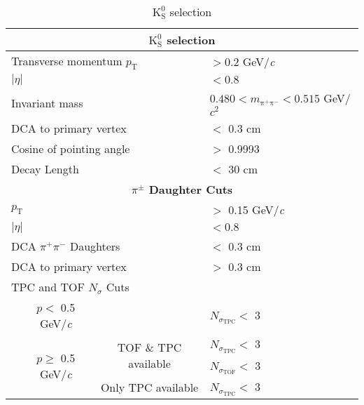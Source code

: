 \documentclass[ALICE,manyauthors]{cernphprep}
\newcommand{\Ks}{$\mathrm{K^{0}_{S}}$\xspace}
\begin{document}
\begin{table}[htbp]
 \centering
  \renewcommand{\arraystretch}{1.05}
  \begin{tabular}{lc|c|l}
   \hline  
   \multicolumn{4}{c}{\textbf{\Ks selection}} \\
   \hline
   \multicolumn{3}{l|}{Transverse momentum $p_{\mathrm{T}}$} & $> 0.2$ GeV/\textit{c} \\
   \hline
   \multicolumn{3}{l|}{$|\eta|$} & $< 0.8$ \\
   \hline
   \multicolumn{3}{l|}{Invariant mass} & $0.480 < m_{\mathrm{\pi^{+}\pi^{-}}} < 0.515$ GeV/$c^{2}$ \\
   \hline
   \multicolumn{3}{l|}{DCA to primary vertex} & $<$ 0.3 cm \\
   \hline
   \multicolumn{3}{l|}{Cosine of pointing angle} & $>$ 0.9993 \\
   \hline
   \multicolumn{3}{l|}{Decay Length} & $<$ 30 cm \\
   \hline
      
   
   \multicolumn{4}{c}{\textbf{$\pi^{\pm}$ Daughter Cuts}} \\
   \hline
   \multicolumn{3}{l|}{$p_{\mathrm{T}}$} & $>$ 0.15 GeV/\textit{c} \\
   \hline
   \multicolumn{3}{l|}{$|\eta|$} &  $< 0.8$ \\
   \hline
   \multicolumn{3}{l|}{DCA $\pi^{+}\pi^{-}$ Daughters} & $<$ 0.3 cm \\
   \hline
   \multicolumn{3}{l|}{DCA to primary vertex} & $>$ 0.3 cm \\
   \hline
   \multicolumn{4}{l}{TPC and TOF $N_{\sigma}$ Cuts} \\
   \cline{2-4}
    & \multicolumn{1}{c}{$p <$ 0.5 GeV/\textit{c}} &  & $N_{\sigma_{\mathrm{TPC}}} <$ 3 \\
   \cline{2-4}
    & \multicolumn{1}{c}{\multirow{3}{*}{$p \geq$ 0.5 GeV/\textit{c}}} &  \multirow{2}{*}{TOF \& TPC available} & $N_{\sigma_{\mathrm{TPC}}} <$ 3 \\
    & \multicolumn{2}{c|}{} & $N_{\sigma_{\mathrm{TOF}}} <$ 3 \\
   \cline{3-4}
    & \multicolumn{1}{c}{} & Only TPC available & $N_{\sigma_{\mathrm{TPC}}} <$ 3 \\
   \hline   
  \end{tabular}
 \caption{\Ks selection}
 \label{tab:K0sCuts} 
\end{table}
\end{document}
